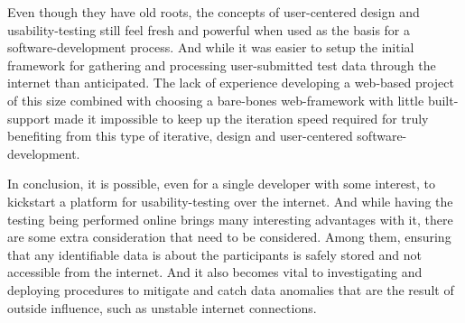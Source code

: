 Even though they have old roots, the concepts of user-centered design and
usability-testing still feel fresh and powerful when used as the basis
for a software-development process. And while it was easier to setup the
initial framework for gathering and processing user-submitted test data through
the internet than anticipated. The lack of experience developing a web-based
project of this size combined with choosing a bare-bones web-framework with
little built-support made it impossible to keep up the iteration speed required
for truly benefiting from this type of iterative, design and user-centered
software-development.

In conclusion, it is possible, even for a single developer with some interest,
to kickstart a platform for usability-testing over the internet. And while
having the testing being performed online brings many interesting advantages
with it, there are some extra consideration that need to be considered. Among
them, ensuring that any identifiable data is about the participants is safely
stored and not accessible from the internet. And it also becomes vital to
investigating and deploying procedures to mitigate and catch data
anomalies that are the result of outside influence, such as unstable
internet connections.


